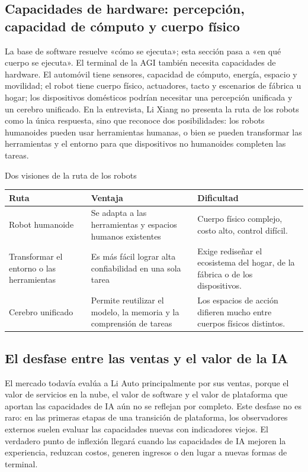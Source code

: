 \documentclass[a4paper]{article}
\begin{document}
\subsection{Capacidades de hardware: percepción, capacidad de cómputo y cuerpo físico}

La base de software resuelve «cómo se ejecuta»; esta sección pasa a «en qué cuerpo se ejecuta». El terminal de la AGI también necesita capacidades de hardware. El automóvil tiene sensores, capacidad de cómputo, energía, espacio y movilidad; el robot tiene cuerpo físico, actuadores, tacto y escenarios de fábrica u hogar; los dispositivos domésticos podrían necesitar una percepción unificada y un cerebro unificado. En la entrevista, Li Xiang no presenta la ruta de los robots como la única respuesta, sino que reconoce dos posibilidades: los robots humanoides pueden usar herramientas humanas, o bien se pueden transformar las herramientas y el entorno para que dispositivos no humanoides completen las tareas.

\begin{knowledgebox}{Dos visiones de la ruta de los robots}
\begin{tabularx}{\textwidth}{p{}p{}X}
\toprule
Ruta & Ventaja & Dificultad \\
\midrule
Robot humanoide & Se adapta a las herramientas y espacios humanos existentes & Cuerpo físico complejo, costo alto, control difícil. \\
Transformar el entorno o las herramientas & Es más fácil lograr alta confiabilidad en una sola tarea & Exige rediseñar el ecosistema del hogar, de la fábrica o de los dispositivos. \\
Cerebro unificado & Permite reutilizar el modelo, la memoria y la comprensión de tareas & Los espacios de acción difieren mucho entre cuerpos físicos distintos. \\
\bottomrule
\end{tabularx}
\end{knowledgebox}

\subsection{El desfase entre las ventas y el valor de la IA}

El mercado todavía evalúa a Li Auto principalmente por sus ventas, porque el valor de servicios en la nube, el valor de software y el valor de plataforma que aportan las capacidades de IA aún no se reflejan por completo. Este desfase no es raro: en las primeras etapas de una transición de plataforma, los observadores externos suelen evaluar las capacidades nuevas con indicadores viejos. El verdadero punto de inflexión llegará cuando las capacidades de IA mejoren la experiencia, reduzcan costos, generen ingresos o den lugar a nuevas formas de terminal.
\end{document}
